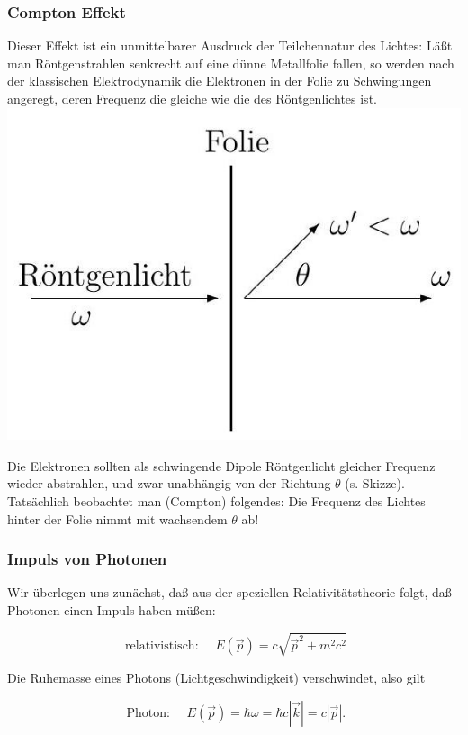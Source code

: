 \documentclass[10pt, letterpaper]{article}
\begin{document}
\subsubsection*{Compton Effekt}
Dieser Effekt ist ein unmittelbarer Ausdruck der Teilchennatur des Lichtes: Läßt man Röntgenstrahlen senkrecht auf eine dünne Metallfolie fallen, so werden nach der klassischen Elektrodynamik die Elektronen in der Folie zu Schwingungen angeregt, deren Frequenz die gleiche wie die des Röntgenlichtes ist.\\
\includegraphics[scale=0.2, center]{2025_05_21_7e716008973ee1b5e8beg-06}

Die Elektronen sollten als schwingende Dipole Röntgenlicht gleicher Frequenz wieder abstrahlen, und zwar unabhängig von der Richtung $\theta$ (s. Skizze). Tatsächlich beobachtet man (Compton) folgendes: Die Frequenz des Lichtes hinter der Folie nimmt mit wachsendem $\theta$ ab!

\subsubsection*{Impuls von Photonen}
Wir überlegen uns zunächst, daß aus der speziellen Relativitätstheorie folgt, daß Photonen einen Impuls haben müßen:

$$
\text { relativistisch: } \quad E(\vec{p})=c \sqrt{\vec{p}^{2}+m^{2} c^{2}}
$$

Die Ruhemasse eines Photons (Lichtgeschwindigkeit) verschwindet, also gilt

$$
\text { Photon: } \quad E(\vec{p})=\hbar \omega=\hbar c|\vec{k}|=c|\vec{p}| .
$$
\end{document}
